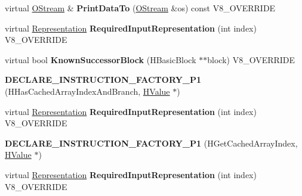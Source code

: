 \begin{DoxyCompactItemize}
\item 
\hypertarget{classv8_1_1internal_1_1_v8___f_i_n_a_l_ac450dad970b14246be761ccf5004924b}{}virtual \hyperlink{classv8_1_1internal_1_1_o_stream}{O\+Stream} \& {\bfseries Print\+Data\+To} (\hyperlink{classv8_1_1internal_1_1_o_stream}{O\+Stream} \&os) const V8\+\_\+\+O\+V\+E\+R\+R\+I\+D\+E\label{classv8_1_1internal_1_1_v8___f_i_n_a_l_ac450dad970b14246be761ccf5004924b}

\item 
\hypertarget{classv8_1_1internal_1_1_v8___f_i_n_a_l_a6c6d1f37f40b113d8f4062f1ffff7215}{}virtual \hyperlink{classv8_1_1internal_1_1_representation}{Representation} {\bfseries Required\+Input\+Representation} (int index) V8\+\_\+\+O\+V\+E\+R\+R\+I\+D\+E\label{classv8_1_1internal_1_1_v8___f_i_n_a_l_a6c6d1f37f40b113d8f4062f1ffff7215}

\item 
\hypertarget{classv8_1_1internal_1_1_v8___f_i_n_a_l_a85ba341b22db01ee3cd7145d9f8e9b99}{}virtual bool {\bfseries Known\+Successor\+Block} (H\+Basic\+Block $\ast$$\ast$block) V8\+\_\+\+O\+V\+E\+R\+R\+I\+D\+E\label{classv8_1_1internal_1_1_v8___f_i_n_a_l_a85ba341b22db01ee3cd7145d9f8e9b99}

\item 
\hypertarget{classv8_1_1internal_1_1_v8___f_i_n_a_l_a9831e3e0730e80820b48d33091704054}{}{\bfseries D\+E\+C\+L\+A\+R\+E\+\_\+\+I\+N\+S\+T\+R\+U\+C\+T\+I\+O\+N\+\_\+\+F\+A\+C\+T\+O\+R\+Y\+\_\+\+P1} (H\+Has\+Cached\+Array\+Index\+And\+Branch, \hyperlink{classv8_1_1internal_1_1_h_value}{H\+Value} $\ast$)\label{classv8_1_1internal_1_1_v8___f_i_n_a_l_a9831e3e0730e80820b48d33091704054}

\item 
\hypertarget{classv8_1_1internal_1_1_v8___f_i_n_a_l_a6c6d1f37f40b113d8f4062f1ffff7215}{}virtual \hyperlink{classv8_1_1internal_1_1_representation}{Representation} {\bfseries Required\+Input\+Representation} (int index) V8\+\_\+\+O\+V\+E\+R\+R\+I\+D\+E\label{classv8_1_1internal_1_1_v8___f_i_n_a_l_a6c6d1f37f40b113d8f4062f1ffff7215}

\item 
\hypertarget{classv8_1_1internal_1_1_v8___f_i_n_a_l_a6122982420cbfed9fccf915292a24219}{}{\bfseries D\+E\+C\+L\+A\+R\+E\+\_\+\+I\+N\+S\+T\+R\+U\+C\+T\+I\+O\+N\+\_\+\+F\+A\+C\+T\+O\+R\+Y\+\_\+\+P1} (H\+Get\+Cached\+Array\+Index, \hyperlink{classv8_1_1internal_1_1_h_value}{H\+Value} $\ast$)\label{classv8_1_1internal_1_1_v8___f_i_n_a_l_a6122982420cbfed9fccf915292a24219}

\item 
\hypertarget{classv8_1_1internal_1_1_v8___f_i_n_a_l_a6c6d1f37f40b113d8f4062f1ffff7215}{}virtual \hyperlink{classv8_1_1internal_1_1_representation}{Representation} {\bfseries Required\+Input\+Representation} (int index) V8\+\_\+\+O\+V\+E\+R\+R\+I\+D\+E\label{classv8_1_1internal_1_1_v8___f_i_n_a_l_a6c6d1f37f40b113d8f4062f1ffff7215}


\end{DoxyCompactItemize}
